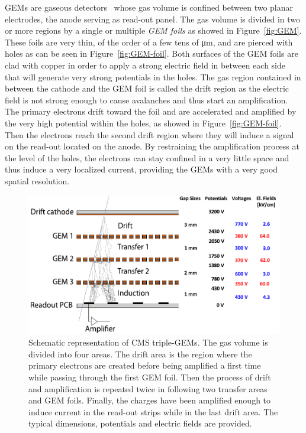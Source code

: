 	\acl{GEM}s are gaseous detectors~\cite{SAULI97} whose gas volume is confined between two planar electrodes, the anode serving as read-out panel. The gas volume is divided in two or more regions by a single or multiple \textit{GEM foils} as showed in Figure~\ref{fig:GEM}. These foils are very thin, of the order of a few tens of \si{\micro m}, and are pierced with holes as can be seen in Figure~\ref{fig:GEM-foil}. Both surfaces of the GEM foils are clad with copper in order to apply a strong electric field in between each side that will generate very strong potentials in the holes. The gas region contained in between the cathode and the GEM foil is called the drift region as the electric field is not strong enough to cause avalanches and thus start an amplification. The primary electrons drift toward the foil and are accelerated and amplified by the very high potential within the holes, as showed in Figure~\ref{fig:GEM-foil}. Then the electrons reach the second drift region where they will induce a signal on the read-out located on the anode. By restraining the amplification process at the level of the holes, the electrons can stay confined in a very little space and thus induce a very localized current, providing the GEMs with a very good spatial resolution.
	
\endgroup

\begingroup\setlength{\intextsep}{5pt}\setlength{\columnsep}{15pt}

	\begin{figure}
		\vspace{-5mm}
		\centering
		\includegraphics[width=\linewidth]{fig/chapt3/GEM-drift.pdf}
		\caption{\label{fig:GEM-drift} Schematic representation of CMS triple-GEMs. The gas volume is divided into four areas. The drift area is the region where the primary electrons are created before being amplified a first time while passing through the first GEM foil. Then the process of drift and amplification is repeated twice in following two transfer areas and GEM foils. Finally, the charges have been amplified enough to induce current in the read-out strips while in the last drift area. The typical dimensions, potentials and electric fields are provided.}
	\end{figure}
	

